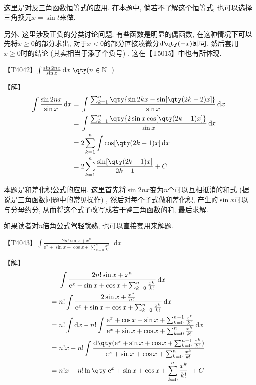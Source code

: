 \documentclass{ctexbook}
\newcommand{\e}{\mathrm{e}}
\newcommand*{\dif}{\mathop{}\!\mathrm{d}}
\begin{document}
{\begin{align*}
\end{align*}\par
{\kaishu 这里是对反三角函数恒等式的应用. 在本题中, 倘若不了解这个恒等式, 也可以选择三角换元$x=\sin{t}$来做. \par
另外, 这里涉及正负的分类讨论问题. 有些函数是明显的偶函数, 在这种情况下可以先将$x\ge0$的部分求出, 对于$x<0$的部分直接凑微分$\dif{\qty(-x)}$即可, 然后套用$x\ge0$时的结论 (其实相当于添了个负号) . 这在【T5015】中也有所体现. \par}
【T4042】$\int\frac{\sin{2nx}}{\sin{x}}\dif{x}\;\qty(n\in\mathbb{N_{+}})$\par
【解】
\begin{align*}
\int\frac{\sin{2nx}}{\sin{x}}\dif{x}={}&\int\frac{\sum_{k=1}^{n}\qty{\sin{2kx}-\sin[\qty(2k-2)x]}}{\sin{x}}\dif{x}\\
={}&\int\frac{\sum_{k=1}^{n}\qty{2\sin{x}\cos[\qty(2k-1)x]}}{\sin{x}}\dif{x}\\
={}&2\sum_{k=1}^{n}\int\cos[\qty(2k-1)x]\dif{x}\\
={}&2\sum_{k=1}^{n}\frac{\sin[\qty(2k-1)x]}{2k-1}+C
\end{align*}\par
{\kaishu 本题是和差化积公式的应用. 这里首先将$\sin{2nx}$变为$n$个可以互相抵消的和式 (据说是三角函数问题中的常见操作) , 然后对每个子式做和差化积, 产生的$\sin{x}$可以与分母约分, 从而将这个式子改写成若干整三角函数的和, 最后求解. \par
如果读者对$n$倍角公式驾轻就熟, 也可以直接套用来解题. \par}
【T4043】$\int\frac{2n!\sin{x}+x^{n}}{\e^{x}+\sin{x}+\cos{x}+\sum_{k=0}^{n}\frac{x^{k}}{k!}}\dif{x}$\par
【解】
\begin{align*}
{}&\int\frac{2n!\sin{x}+x^{n}}{\e^{x}+\sin{x}+\cos{x}+\sum_{k=0}^{n}\frac{x^{k}}{k!}}\dif{x}\\
={}&n!\int\frac{2\sin{x}+\frac{x^{n}}{n!}}{\e^{x}+\sin{x}+\cos{x}+\sum_{k=0}^{n}\frac{x^{k}}{k!}}\dif{x}\\
={}&n!\int\dif{x}-n!\int\frac{\e^{x}+\cos{x}-\sin{x}+\sum_{k=0}^{n-1}\frac{x^{k}}{k!}}{\e^{x}+\sin{x}+\cos{x}+\sum_{k=0}^{n}\frac{x^{k}}{k!}}\dif{x}\\
={}&n!x-n!\int\frac{\dif{\qty(\e^{x}+\sin{x}+\cos{x}+\sum_{k=0}^{n-1}\frac{x^{k}}{k!})}}{\e^{x}+\sin{x}+\cos{x}+\sum_{k=0}^{n}\frac{x^{k}}{k!}}\\
={}&n!x-n!\ln\qty|\e^{x}+\sin{x}+\cos{x}+\sum_{k=0}^{n}\frac{x^{k}}{k!}|+C
\end{align*}\par
}
\end{document}
